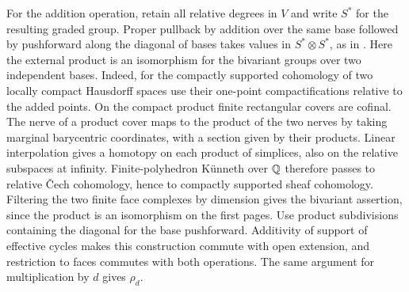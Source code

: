 For the addition operation, retain all relative degrees in $V$ and
write $S^*$ for the resulting graded group. Proper pullback by addition
over the same base followed by pushforward along the diagonal of bases
takes values in $S^*\otimes S^*$, as in
\cite[Definitions~2.3 and~3.9]{Pardon}. Here the external product is
an isomorphism for the bivariant groups over two independent bases.
Indeed, for the compactly supported cohomology of two locally compact
Hausdorff spaces use their one-point compactifications relative to
the added points. On the compact product finite rectangular covers
are cofinal. The nerve of a product cover maps to the product of the
two nerves by taking marginal barycentric coordinates, with a section
given by their products. Linear interpolation gives a homotopy on
each product of simplices, also on the relative subspaces at infinity.
Finite-polyhedron Künneth over $\mathbb Q$ therefore passes to relative
Čech cohomology, hence to compactly supported sheaf cohomology.
Filtering the two finite face complexes by dimension gives the
bivariant assertion, since the product is an isomorphism on the first
pages. Use product subdivisions containing the diagonal for the
base pushforward. Additivity of support of effective cycles makes
this construction commute with open extension, and restriction to
faces commutes with both operations. The same argument for
multiplication by $d$ gives $\rho_d$.
